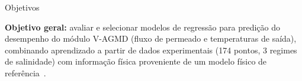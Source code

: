 \begin{slide}{Objetivos}
  \footnotesize
  \begin{myTitledBox}[Objetivos]
    \textbf{Objetivo geral:} avaliar e selecionar modelos de regressão para predição do desempenho do módulo V-AGMD (fluxo de permeado e temperaturas de saída), combinando aprendizado a partir de dados experimentais (174 pontos, 3 regimes de salinidade) com informação física proveniente de um modelo físico de referência~\cite{Lisboa2024}.
  \end{myTitledBox}
\end{slide}

\nocite{Abid2020}
\nocite{Lisboa2024}
\endgroup
